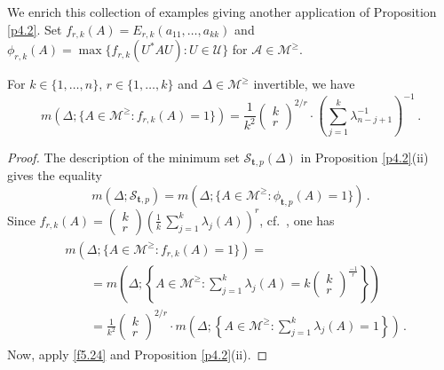 \documentclass{amsart}
\begin{document}
We enrich this collection of examples giving another application of Proposition \ref{p4.2}. Set $f_{r,k}(A) = E_{r,k} (a_{11},\ldots,a_{kk})$ and $\phi_{r,k}(A) = \max \{ f_{r,k} (U^*AU) : U  \in {\mathcal U} \}$ for ${\mathcal A} \in {\mathcal M}^\geq$. 

\begin{pro} \label{p5.10}
For $k \in \{ 1,\ldots,n \}$, $r \in \{ 1,\ldots,k \}$ and $\Delta \in {\mathcal M}^\geq$ invertible, we have 
\begin{equation*}
    m( \Delta ; \{ A \in {\mathcal M}^\geq : f_{r,k} (A)=1 \} ) = \frac{1}{k^2} \left( \begin{array}{c} k \\  r \end{array} \right)^{2/r} \cdot \left(\sum_{j=1}^k \lambda_{n-j+1}^{-1} \right)^{-1} \, .
\end{equation*}
\end{pro}

\begin{proof}
The description of the minimum set ${\mathcal S}_{{\mathbf t},p}(\Delta )$ in Proposition \ref{p4.2}(ii) gives the equality 
\begin{equation} \label{f5.24}
       m(\Delta ; {\mathcal S}_{{\mathbf t},p} ) = m(\Delta ; \{ A \in {\mathcal M}^\geq : \phi_{{\mathbf t},p}(A) = 1 \}) \, .
\end{equation}
Since  $ f_{r,k}(A) = \left( \begin{array}{c} k \\ r \end{array} \right) \left( \frac{1}{k} \, \sum_{j=1}^k \lambda_j(A) \right)^r$, cf.~\cite[Cor.~after Thm.~2]{MM}, one has 
\begin{eqnarray*}
\begin{split}
& m(\Delta ; \{  A \in  {\mathcal M}^\geq : f_{r,k}(A)=1 \}) = \\
   & \quad \quad =  m \left(\Delta ; \left\{ A \in {\mathcal M}^\geq : \sum_{j=1}^k \lambda_j(A) = k \left( \begin{array}{c} k \\ r \end{array} \right)^\frac{-1}{r} \right\} \right) \\
   & \quad \quad =  \frac{1}{k^2} \left( \begin{array}{c} k \\ r \end{array} \right)^{2/r}  \cdot m\left(\Delta ; \left\{ A \in {\mathcal M}^\geq : \sum_{j=1}^k \lambda_j(A)=1 \right\}\right) \, . 
\end{split}   
\end{eqnarray*}
Now, apply \eqref{f5.24} and Proposition \ref{p4.2}(ii). 
\end{proof}
\end{document}
